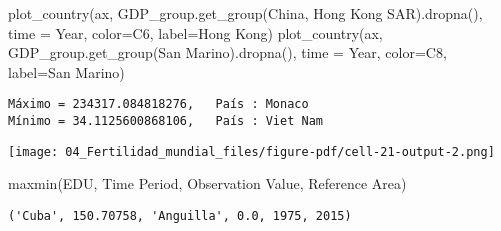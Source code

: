 \documentclass[
  letterpaper,
  DIV=11,
  numbers=noendperiod]{scrreprt}
\newenvironment{Shaded}{\begin{snugshade}}{\end{snugshade}}
\newcommand{\NormalTok}[1]{\textcolor[rgb]{0.00,0.23,0.31}{#1}}
\newcommand{\OperatorTok}[1]{\textcolor[rgb]{0.37,0.37,0.37}{#1}}
\newcommand{\StringTok}[1]{\textcolor[rgb]{0.13,0.47,0.30}{#1}}
\begin{document}
\begin{Shaded}
\begin{Highlighting}[]
\NormalTok{plot\_country(ax, GDP\_group.get\_group(}\StringTok{\textquotesingle{}China, Hong Kong SAR\textquotesingle{}}\NormalTok{).dropna(), time }\OperatorTok{=} \StringTok{\textquotesingle{}Year\textquotesingle{}}\NormalTok{, color}\OperatorTok{=}\StringTok{\textquotesingle{}C6\textquotesingle{}}\NormalTok{, label}\OperatorTok{=}\StringTok{\textquotesingle{}Hong Kong\textquotesingle{}}\NormalTok{)}
\NormalTok{plot\_country(ax, GDP\_group.get\_group(}\StringTok{\textquotesingle{}San Marino\textquotesingle{}}\NormalTok{).dropna(), time }\OperatorTok{=} \StringTok{\textquotesingle{}Year\textquotesingle{}}\NormalTok{, color}\OperatorTok{=}\StringTok{\textquotesingle{}C8\textquotesingle{}}\NormalTok{, label}\OperatorTok{=}\StringTok{\textquotesingle{}San Marino\textquotesingle{}}\NormalTok{)}
\end{Highlighting}
\end{Shaded}

\begin{verbatim}
Máximo = 234317.084818276,   País : Monaco
Mínimo = 34.1125600868106,   País : Viet Nam
\end{verbatim}

\texttt{[image: 04\_Fertilidad\_mundial\_files/figure-pdf/cell-21-output-2.png]}

\begin{Shaded}
\begin{Highlighting}[]
\NormalTok{maxmin(EDU, }\StringTok{\textquotesingle{}Time Period\textquotesingle{}}\NormalTok{, }\StringTok{\textquotesingle{}Observation Value\textquotesingle{}}\NormalTok{, }\StringTok{\textquotesingle{}Reference Area\textquotesingle{}}\NormalTok{)}
\end{Highlighting}
\end{Shaded}

\begin{verbatim}
('Cuba', 150.70758, 'Anguilla', 0.0, 1975, 2015)
\end{verbatim}
\end{document}
